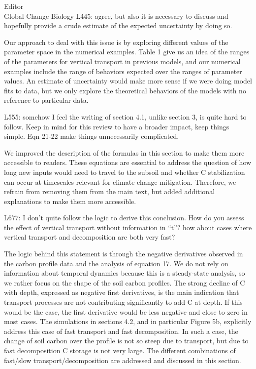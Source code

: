 \documentclass[11pt]{bgcletter}
\newcommand{\answer}[1] {
{\color{cyan} #1}
}
\begin{document}
\begin{letter}{Editor\\
   Global Change Biology
}
L445: agree, but also it is necessary to discuss and hopefully provide a crude estimate of the expected uncertainty by doing so.

\answer{Our approach to deal with this issue is by exploring different values of the parameter space in the numerical examples. Table 1 give us an idea of the ranges of the parameters for vertical transport in previous models, and our numerical examples include the range of behaviors expected over the ranges of parameter values. An estimate of uncertainty would make more sense if we were doing model fits to data, but we only explore the theoretical behaviors of the models with no reference to particular data.}

L555: somehow I feel the writing of section 4.1, unlike section 3, is quite hard to follow. Keep in mind for this review to have a broader impact, keep things simple. Eqn 21-22 make things unnecessarily complicated.

\answer{We improved the description of the formulas in this section to make them more accessible to readers. These equations are essential to address the question of how long new inputs would need to travel to the subsoil and whether C stabilization can occur at timescales relevant for climate change mitigation. Therefore, we refrain from removing them from the main text, but added additional explanations to make them more accessible.}

L677: I don't quite follow the logic to derive this conclusion. How do you assess the effect of vertical transport without information in ``t''? how about cases where vertical transport and decomposition are both very fast?

\answer{The logic behind this statement is through the negative derivatives observed in the carbon profile data and the analysis of equation 17. We do not rely on information about temporal dynamics because this is a steady-state analysis, so we rather focus on the shape of the soil carbon profiles. The strong decline of C with depth, expressed as negative first derivatives, is the main indication that transport processes are not contributing significantly to add C at depth. If this would be the case, the first derivative would be less negative and close to zero in most cases. The simulations in sections 4.2, and in particular Figure 5b, explicitly address this case of fast transport and fast decomposition. In such a case, the change of soil carbon over the profile is not so steep due to transport, but due to fast decomposition C storage is not very large. The different combinations of fast/slow transport/decomposition are addressed and discussed in this section. }


\end{letter}
\end{document}

